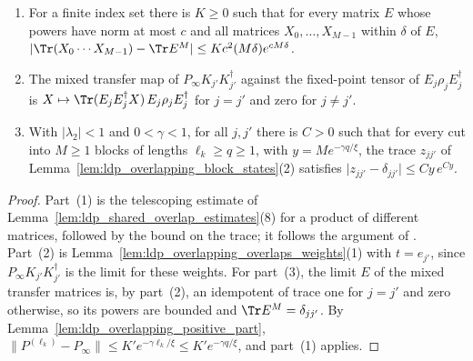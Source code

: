 \begin{lemma}
    \label{lem:ldp_overlapping_block_overlaps_limit}
    \leanok
    \begin{enumerate}
        \item For a finite index set there is $K\geq0$ such that for every
              matrix $E$ whose powers have norm at most $c$ and all matrices
              $X_0,\dots,X_{M-1}$ within $\delta$ of $E$,
              $\lvert\Tr(X_0\cdots X_{M-1})-\Tr E^M\rvert\leq Kc^2(M\delta)
                  e^{cM\delta}$.
        \item The mixed transfer map of $P_\infty K_{j'}K_{j'}^\dagger$ against
              the fixed-point tensor of $E_j\rho_jE_j^\dagger$ is
              $X\mapsto\Tr(E_jE_j^\dagger X)\,E_j\rho_jE_j^\dagger$ for $j=j'$
              and zero for $j\neq j'$.
        \item With $|\lambda_2|<1$ and $0<\gamma<1$, for all $j,j'$ there is
              $C>0$ such that for every cut into $M\geq1$ blocks of lengths
              $\ell_k\geq q\geq1$, with $y=Me^{-\gamma q/\xi}$, the trace
              $z_{jj'}$ of Lemma~\ref{lem:ldp_overlapping_block_states}(2)
              satisfies $\lvert z_{jj'}-\delta_{jj'}\rvert\leq Cy\,e^{Cy}$.
    \end{enumerate}
\end{lemma}
\begin{proof}
    \leanok
    Part~(1) is the telescoping estimate of
    Lemma~\ref{lem:ldp_shared_overlap_estimates}(8) for a product of different
    matrices, followed by the bound on the trace; it follows the argument of
    \cite[Supplemental Material]{Piroli2021LOCC}. Part~(2) is
    Lemma~\ref{lem:ldp_overlapping_overlaps_weights}(1) with $t=e_{j'}$, since
    $P_\infty K_{j'}K_{j'}^\dagger$ is the limit for these weights. For
    part~(3), the limit $E$ of the mixed transfer matrices is, by part~(2), an
    idempotent of trace one for $j=j'$ and zero otherwise, so its powers are
    bounded and $\Tr E^M=\delta_{jj'}$. By
    Lemma~\ref{lem:ldp_overlapping_positive_part},
    $\lVert P^{(\ell_k)}-P_\infty\rVert\leq K'e^{-\gamma\ell_k/\xi}\leq
        K'e^{-\gamma q/\xi}$, and part~(1) applies.
\end{proof}

